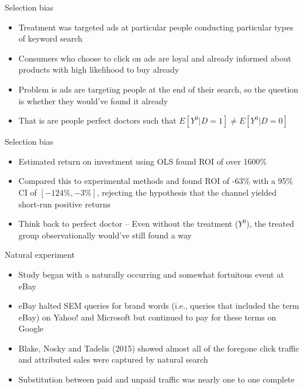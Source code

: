 \documentclass{beamer}
\begin{document}
\begin{frame}{Selection bias}

\begin{itemize}
\item Treatment was targeted ads at particular people conducting particular types of keyword search
\item Consumers who choose to click on ads are loyal and already informed about products with high likelihood to buy already 
\item Problem is ads are targeting people at the end of their search, so the question is whether they would've found it already 
\item That is are people perfect doctors such that $E[Y^0|D=1] \neq E[Y^0|D=0]$
\end{itemize}


\end{frame}



\begin{frame}{Selection bias}

\begin{itemize}
\item Estimated return on investment using OLS  found ROI of over 1600\%
\item Compared this to experimental methods and found ROI of -63\% with a 95\% CI of $[-124\%, -3\%]$, rejecting the hypothesis that the channel yielded short-run positive returns
\item Think back to perfect doctor -- Even without the treatment ($Y^0$), the treated group observationally would've still found a way
\end{itemize}

\end{frame}

\begin{frame}{Natural experiment}

\begin{itemize}
\item Study began with a naturally occurring and somewhat fortuitous  event at eBay
\item eBay halted SEM queries for brand words (i.e., queries that included the term eBay) on Yahoo! and Microsoft but continued to pay for these terms on Google
\item Blake, Nosky and Tadelis (2015) showed almost all of the foregone click traffic and attributed sales were captured by natural search
\item Substitution between paid and unpaid traffic was nearly one to one complete
\end{itemize}

\end{frame}
\end{document}
